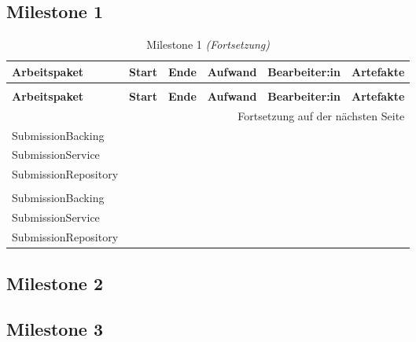\newcommand{\atable}[3]{\begin{longtable}{llllll}
                            \caption{#2}\label{tab:#1} \\
                            \toprule
                            \textbf{Arbeitspaket} & \textbf{Start} & \textbf{Ende} & \textbf{Aufwand} & \textbf{Bearbeiter:in} & \textbf{Artefakte}
                            \\
                            \midrule
                            \endfirsthead

                            \caption{#2 \emph{(Fortsetzung)}}\\
                            \toprule
                            \textbf{Arbeitspaket} & \textbf{Start} & \textbf{Ende} & \textbf{Aufwand} & \textbf{Bearbeiter:in} & \textbf{Artefakte}
                            \\
                            \midrule
                            \endhead

                            \multicolumn{6}{r}{{Fortsetzung auf der nächsten Seite}}
                            \endfoot

                            \bottomrule
                            \endlastfoot

                            #3
\end{longtable}
}

\newcommand{\aentry}[6]{\footnotesize\makecell{#1} & \footnotesize\makecell{#2} & \footnotesize\makecell{#3} & \footnotesize\makecell{#4} & \footnotesize\makecell{#5} & \footnotesize\makecell{#6}\\\midrule}

\renewcommand{\cellalign}{cl}

\begin{landscape}

\subsection{Milestone 1}
\atable{milestone1}{Milestone 1}{
    \aentry{Submission}{10.12.2021}{20.12.2021}{5~h}{Joergen Sprenger}{submission.xhtml\\SubmissionBacking\\SubmissionService\\SubmissionRepository}
    \aentry{Submission}{10.12.2021}{20.12.2021}{5~h}{Joergen Sprenger}{submission.xhtml\\SubmissionBacking\\SubmissionService\\SubmissionRepository}
}

\subsection{Milestone 2}

\subsection{Milestone 3}

\end{landscape}